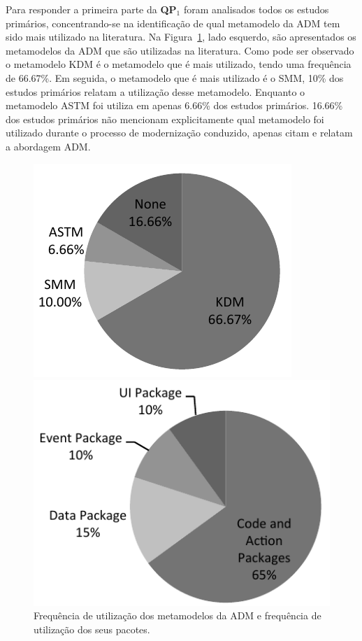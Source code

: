 Para responder a primeira parte da \textbf{QP$_1$} foram analisados todos os estudos primários, concentrando-se na identificação de qual metamodelo da ADM tem sido mais utilizado na literatura. Na Figura~\ref{fig:frequencia_kdm_packages}, lado esquerdo, são apresentados os metamodelos da ADM que são utilizadas na literatura. Como pode ser observado o metamodelo KDM é o metamodelo que é mais utilizado, tendo uma frequência de 66.67\%. Em seguida, o metamodelo que é mais utilizado é o SMM, 10\% dos estudos primários relatam a utilização desse metamodelo. Enquanto o metamodelo ASTM foi utiliza em apenas 6.66\% dos estudos primários. 16.66\% dos estudos primários não mencionam explicitamente qual metamodelo foi utilizado durante o processo de modernização conduzido, apenas citam e relatam a abordagem ADM.

\begin{figure}[!h]
\caption{Frequência de utilização dos metamodelos da ADM e frequência de utilização dos seus pacotes.}
 \label{fig:frequencia_kdm_packages}
\centering
\begin{minipage}{.5\textwidth}
  \centering
  \includegraphics[scale=0.9]{images/MetamodelosDIstribuition}
\end{minipage}%
\begin{minipage}{.5\textwidth}
  \centering
  \includegraphics[scale=0.9]{images/PacotesKDM}
\end{minipage}
\fautor
\end{figure}

